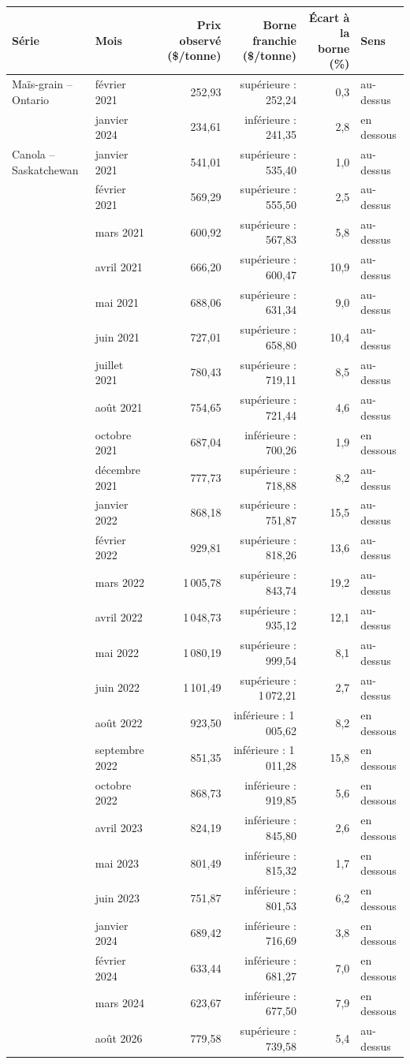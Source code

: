 \begin{tabular}{llrrrl}
\toprule
Série & Mois & Prix observé (\$/tonne) & Borne franchie (\$/tonne) & Écart à la borne (\%) & Sens \\
\midrule
Maïs-grain -- Ontario & février 2021 & 252,93 & supérieure : 252,24 & 0,3 & au-dessus \\
 & janvier 2024 & 234,61 & inférieure : 241,35 & 2,8 & en dessous \\
\midrule
Canola -- Saskatchewan & janvier 2021 & 541,01 & supérieure : 535,40 & 1,0 & au-dessus \\
 & février 2021 & 569,29 & supérieure : 555,50 & 2,5 & au-dessus \\
 & mars 2021 & 600,92 & supérieure : 567,83 & 5,8 & au-dessus \\
 & avril 2021 & 666,20 & supérieure : 600,47 & 10,9 & au-dessus \\
 & mai 2021 & 688,06 & supérieure : 631,34 & 9,0 & au-dessus \\
 & juin 2021 & 727,01 & supérieure : 658,80 & 10,4 & au-dessus \\
 & juillet 2021 & 780,43 & supérieure : 719,11 & 8,5 & au-dessus \\
 & août 2021 & 754,65 & supérieure : 721,44 & 4,6 & au-dessus \\
 & octobre 2021 & 687,04 & inférieure : 700,26 & 1,9 & en dessous \\
 & décembre 2021 & 777,73 & supérieure : 718,88 & 8,2 & au-dessus \\
 & janvier 2022 & 868,18 & supérieure : 751,87 & 15,5 & au-dessus \\
 & février 2022 & 929,81 & supérieure : 818,26 & 13,6 & au-dessus \\
 & mars 2022 & 1\,005,78 & supérieure : 843,74 & 19,2 & au-dessus \\
 & avril 2022 & 1\,048,73 & supérieure : 935,12 & 12,1 & au-dessus \\
 & mai 2022 & 1\,080,19 & supérieure : 999,54 & 8,1 & au-dessus \\
 & juin 2022 & 1\,101,49 & supérieure : 1\,072,21 & 2,7 & au-dessus \\
 & août 2022 & 923,50 & inférieure : 1\,005,62 & 8,2 & en dessous \\
 & septembre 2022 & 851,35 & inférieure : 1\,011,28 & 15,8 & en dessous \\
 & octobre 2022 & 868,73 & inférieure : 919,85 & 5,6 & en dessous \\
 & avril 2023 & 824,19 & inférieure : 845,80 & 2,6 & en dessous \\
 & mai 2023 & 801,49 & inférieure : 815,32 & 1,7 & en dessous \\
 & juin 2023 & 751,87 & inférieure : 801,53 & 6,2 & en dessous \\
 & janvier 2024 & 689,42 & inférieure : 716,69 & 3,8 & en dessous \\
 & février 2024 & 633,44 & inférieure : 681,27 & 7,0 & en dessous \\
 & mars 2024 & 623,67 & inférieure : 677,50 & 7,9 & en dessous \\
 & août 2026 & 779,58 & supérieure : 739,58 & 5,4 & au-dessus \\
\bottomrule
\end{tabular}
